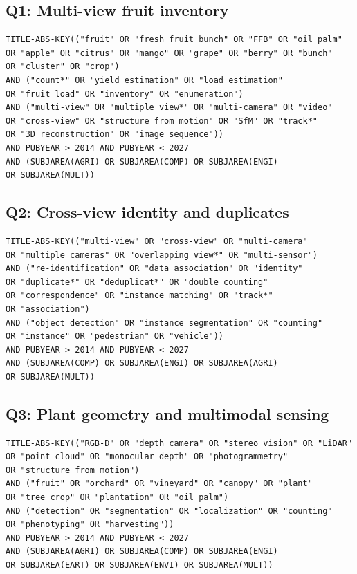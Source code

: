 \subsection*{Q1: Multi-view fruit inventory}
\begin{verbatim}
TITLE-ABS-KEY(("fruit" OR "fresh fruit bunch" OR "FFB" OR "oil palm"
OR "apple" OR "citrus" OR "mango" OR "grape" OR "berry" OR "bunch"
OR "cluster" OR "crop")
AND ("count*" OR "yield estimation" OR "load estimation"
OR "fruit load" OR "inventory" OR "enumeration")
AND ("multi-view" OR "multiple view*" OR "multi-camera" OR "video"
OR "cross-view" OR "structure from motion" OR "SfM" OR "track*"
OR "3D reconstruction" OR "image sequence"))
AND PUBYEAR > 2014 AND PUBYEAR < 2027
AND (SUBJAREA(AGRI) OR SUBJAREA(COMP) OR SUBJAREA(ENGI)
OR SUBJAREA(MULT))
\end{verbatim}

\subsection*{Q2: Cross-view identity and duplicates}
\begin{verbatim}
TITLE-ABS-KEY(("multi-view" OR "cross-view" OR "multi-camera"
OR "multiple cameras" OR "overlapping view*" OR "multi-sensor")
AND ("re-identification" OR "data association" OR "identity"
OR "duplicate*" OR "deduplicat*" OR "double counting"
OR "correspondence" OR "instance matching" OR "track*"
OR "association")
AND ("object detection" OR "instance segmentation" OR "counting"
OR "instance" OR "pedestrian" OR "vehicle"))
AND PUBYEAR > 2014 AND PUBYEAR < 2027
AND (SUBJAREA(COMP) OR SUBJAREA(ENGI) OR SUBJAREA(AGRI)
OR SUBJAREA(MULT))
\end{verbatim}

\subsection*{Q3: Plant geometry and multimodal sensing}
\begin{verbatim}
TITLE-ABS-KEY(("RGB-D" OR "depth camera" OR "stereo vision" OR "LiDAR"
OR "point cloud" OR "monocular depth" OR "photogrammetry"
OR "structure from motion")
AND ("fruit" OR "orchard" OR "vineyard" OR "canopy" OR "plant"
OR "tree crop" OR "plantation" OR "oil palm")
AND ("detection" OR "segmentation" OR "localization" OR "counting"
OR "phenotyping" OR "harvesting"))
AND PUBYEAR > 2014 AND PUBYEAR < 2027
AND (SUBJAREA(AGRI) OR SUBJAREA(COMP) OR SUBJAREA(ENGI)
OR SUBJAREA(EART) OR SUBJAREA(ENVI) OR SUBJAREA(MULT))
\end{verbatim}

